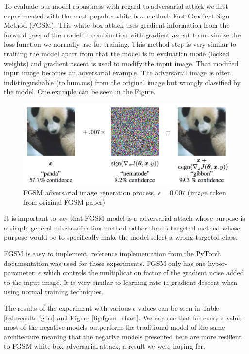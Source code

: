 \documentclass[b5paper]{book}
\begin{document}
To evaluate our model robustness with regard to adversarial attack we first experimented with the most-popular white-box method: Fast Gradient Sign Method (FGSM). This white-box attack uses gradient information from the forward pass of the model in combination with gradient ascent to maximize the loss function we normally use for training. This method step is very similar to training the model apart from that the model is in evaluation mode (locked weights) and gradient ascent is used to modify the input image. That modified input image becomes an adversarial example. The adversarial image is often indistinguishable (to humans) from the original image but wrongly classified by the model. One example can be seen in the Figure. 

\begin{figure}
\centering
  \includegraphics[width=1\textwidth]{figures/fgsm_panda_image.png}
\caption{FGSM adversarial image generation process, \( \epsilon = 0.007 \) (image taken from original FGSM paper)}
\label{fig:fgsmpanda}       %
\end{figure}

It is important to say that FGSM model is a adversarial attach whose purpose is a simple general misclassification method rather than a targeted method whose purpose would be to specifically make the model select a wrong targeted class.

FGSM is easy to implement, reference implementation from the PyTorch documentation was used for these experiments. FGSM only has one hyper-parameter: \( \epsilon \) which controls the multiplication factor of the gradient noise added to the input image. It is very similar to learning rate in gradient descent when using normal training techniques.

The results of the experiment with various \( \epsilon \) values can be seen in Table \ref{tab:results-fgsm} and Figure \ref{fig:fgsm_chart}. We can see that for every \( \epsilon \) value most of the negative models outperform the traditional model of the same architecture meaning that the negative models presented here are more resilient to FGSM white box adversarial attack, a result we were hoping for.
\end{document}
